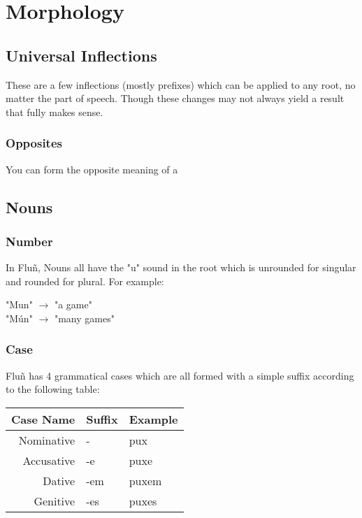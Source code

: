 \documentclass{book}
\newcommand{\ö}{\textscoelig}
\begin{document}
\chapter{Morphology}
\section{Universal Inflections}
These are a few inflections (mostly prefixes) which can be applied to any root, no matter the
part of speech. Though these changes may not always yield a result that fully makes sense.

\subsection{Opposites}
You can form the opposite meaning of a 

\section{Nouns}
\subsection{Number}
In Fluñ, Nouns all have the "u" sound in the root which is unrounded for singular and rounded for plural.
For example:

\begin{center}
    "Mun" $\rightarrow$ "a game" \\
    "Mún" $\rightarrow$ "many games"
\end{center}

\subsection{Case}
Fluñ has 4 grammatical cases which are all formed with a simple suffix according to the following table:

\begin{center}
    \begin{tabular}{|r|l|l|}
        \hline
        Case Name   & Suffix    & Example \\
        \hline
        Nominative  & -         & pux \\
        Accusative  & -e        & puxe \\
        Dative      & -em       & puxem \\
        Genitive    & -es       & puxes \\
        \hline
    \end{tabular}
\end{center}
\end{document}
